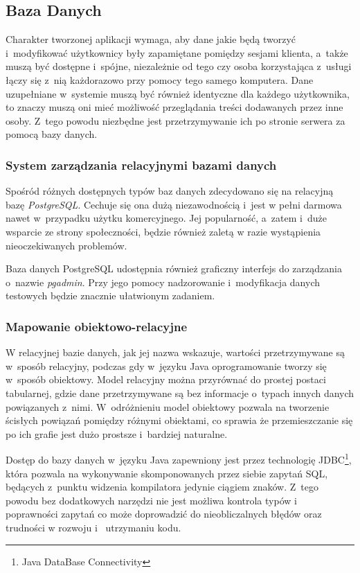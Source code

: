 \documentclass[11pt]{aghdpl}
\begin{document}
\subsection{Baza Danych}
\label{sec:bazaDanych}

Charakter tworzonej aplikacji wymaga, aby dane jakie będą tworzyć i~modyfikować użytkownicy były zapamiętane pomiędzy sesjami klienta, a~także muszą być dostępne i~spójne, niezależnie od tego czy osoba korzystająca z~usługi łączy się z~nią każdorazowo przy pomocy tego samego komputera. Dane uzupełniane w~systemie muszą być również identyczne dla każdego użytkownika, to znaczy muszą oni mieć możliwość przeglądania treści dodawanych przez inne osoby. Z~tego powodu niezbędne jest przetrzymywanie ich po stronie serwera za pomocą bazy danych.

\subsubsection{System zarządzania relacyjnymi bazami danych}

Spośród różnych dostępnych typów baz danych zdecydowano się na relacyjną bazę \emph{PostgreSQL}. Cechuje się ona dużą niezawodnością i~jest w pełni darmowa nawet w~przypadku użytku komercyjnego. Jej popularność, a~zatem i~duże wsparcie ze strony społeczności, będzie również zaletą w razie wystąpienia nieoczekiwanych problemów.

Baza danych PostgreSQL udostępnia również graficzny interfejs do zarządzania o~nazwie \emph{pgadmin}. Przy jego pomocy nadzorowanie i~modyfikacja danych testowych będzie znacznie ułatwionym zadaniem.

\subsubsection{Mapowanie obiektowo-relacyjne}

W relacyjnej bazie danych, jak jej nazwa wskazuje, wartości przetrzymywane są w~sposób relacyjny, podczas gdy w~języku Java oprogramowanie tworzy się w~sposób obiektowy. Model relacyjny można przyrównać do prostej postaci tabularnej, gdzie dane przetrzymywane są bez informacje o~typach innych danych powiązanych z~nimi. W~odróżnieniu model obiektowy pozwala na tworzenie ścisłych powiązań pomiędzy różnymi obiektami, co sprawia że przemieszczanie się po ich grafie jest dużo prostsze i~bardziej naturalne.

Dostęp do bazy danych w~języku Java zapewniony jest przez technologię JDBC\footnote{Java DataBase Connectivity}, która pozwala na wykonywanie skomponowanych przez siebie zapytań SQL, będących z~punktu widzenia kompilatora jedynie ciągiem znaków. Z~tego powodu bez dodatkowych narzędzi nie jest możliwa kontrola typów i~ poprawności zapytań co może doprowadzić do nieobliczalnych błędów oraz trudności w rozwoju i~ utrzymaniu kodu.
\end{document}
